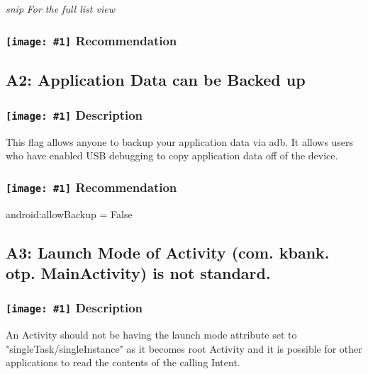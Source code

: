 \documentclass[12p]{article}
\newcommand{\icon}[1]{\texttt{[image: \#1]}}
\begin{document}




\textit{snip}
\newline \textsl{For the full list view }
\subsubsection*{\protect\icon{/home/miki/Documents/GITHUB/AndroidPermissions/python/vulns/report_icons/basic_todo.png} Recommendation}

\subsection{A2: Application Data can be Backed up}
\subsubsection*{\protect\icon{/home/miki/Documents/GITHUB/AndroidPermissions/python/vulns/report_icons/basic_sheet.png} Description}
This flag allows anyone to backup your application data via adb. It allows users who have enabled USB debugging to copy application data off of the device.
\subsubsection*{\protect\icon{/home/miki/Documents/GITHUB/AndroidPermissions/python/vulns/report_icons/basic_todo.png} Recommendation}
android:allowBackup = False
\subsection{A3: Launch Mode of Activity (com. kbank. otp. MainActivity) is not standard.}
\subsubsection*{\protect\icon{/home/miki/Documents/GITHUB/AndroidPermissions/python/vulns/report_icons/basic_sheet.png} Description}
An Activity should not be having the launch mode attribute set to "singleTask/singleInstance" as it becomes root Activity and it is possible for other applications to read the contents of the calling Intent.
\end{document}

